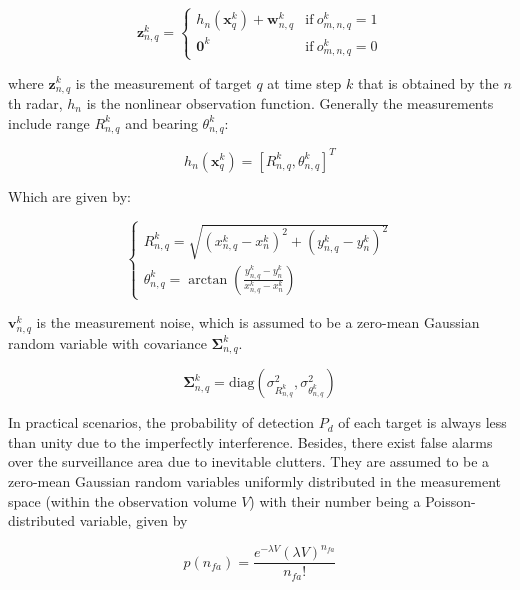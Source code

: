 \documentclass[12pt,journal,draftclsnofoot,onecolumn]{IEEEtran}
\begin{document}
\begin{equation}
    \mathbf{z}_{n,q}^k=\begin{cases} h_{n}(\mathbf{x}_q^k)+\mathbf{w}_{n,q}^k & \text{if}\ o_{m,n,q}^k=1\\ \mathbf{0}^k & \text{if}\ o_{m,n,q}^k=0
    	\end{cases}
    \label{measurement function}
\end{equation}

where $\mathbf{z}_{n,q}^k$ is the measurement of target $q$ at time step $k$ that is obtained by the $n$th radar, $h_{n}$ is the nonlinear observation function. Generally the measurements include range $R_{n,q}^k$ and bearing $\theta_{n,q}^k$:

\begin{equation}
	h_{n}(\mathbf{x}_q^k)=[R_{n,q}^k, \theta_{n,q}^k]^T
\end{equation}

Which are given by:

\begin{equation}
	\begin{cases}
		R_{n,q}^k= \sqrt{(x_{n,q}^k - x_n^k)^2+(y_{n,q}^k - y_n^k)^2} \\ 
		\theta_{n,q}^k=\arctan {(\frac{{y_{n,q}^k - y_n^k}}{{x_{n,q}^k - x_n^k}})} 
	\end{cases}	
\end{equation}

$\mathbf{v}_{n,q}^k$ is the measurement noise, which is assumed to be a zero-mean Gaussian random variable with covariance $\mathbf{\Sigma}_{n,q}^k$. 

\begin{equation} 
\boldsymbol {\Sigma}_{n,q}^k = \text{diag}\left({\sigma _{R_{n,q}^k}^2,\sigma _{\theta _{n,q}^k}^2} \right)
\label{measurement noise covariance}
\end{equation}

In practical scenarios, the probability of detection $P_d$ of each target is always less than unity due to the imperfectly interference. Besides, there exist false alarms over the surveillance area due to inevitable clutters. They are assumed to be a zero-mean Gaussian random variables uniformly distributed in the measurement space (within the observation volume $V$) with their number being a Poisson-distributed variable, given by 


\begin{equation}
	p(n_{fa})=\frac{e^{-\lambda V}(\lambda V)^{n_{fa}}}{n_{fa}!}
\end{equation} 
\end{document}
